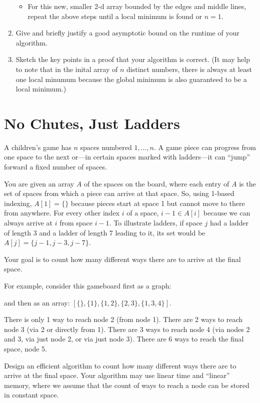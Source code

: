 \documentclass[11pt, oneside]{article}   	%
\theoremstyle{definition}
\theoremstyle{remark}
\begin{document}
\begin{enumerate}
\begin{itemize}
   \item For this new, smaller 2-d array bounded by the edges and middle lines, repeat the above steps until a local minimum is found or $n=1$.
   \end{itemize}
\item Give and briefly justify a good asymptotic bound on the runtime of
   your algorithm.
\item Sketch the key points in a proof that your algorithm is
   correct. (It may help to note that in the inital array of $n$
   distinct numbers, there is always at least one local minumum
   because the global minimum is also guaranteed to be a local
   minimum.)
\end{enumerate}

\section{No Chutes, Just Ladders}
\label{sec-4}

A children's game has $n$ spaces numbered $1, \ldots, n$. A game piece
can progress from one space to the next or---in certain spaces marked
with ladders---it can ``jump'' forward a fixed number of spaces.

You are given an array $A$ of the spaces on the board, where each
entry of $A$ is the set of spaces from which a piece can arrive at
that space. So, using 1-based indexing, $A[1] = \{\}$ because pieces
start at space 1 but cannot move to there from anywhere. For every
other index $i$ of a space, $i-1 \in A[i]$ because we can always
arrive at $i$ from space $i-1$. To illustrate ladders, if space $j$
had a ladder of length 3 and a ladder of length 7 leading to it, its
set would be $A[j] = \{j-1, j-3, j-7\}$.

Your goal is to count how many different ways there are to arrive at
the final space.

For example, consider this gameboard first as a graph:


and then as an array: $[\{\}, \{1\}, \{1,2\}, \{2,3\}, \{1,3,4\}]$.

There is only 1 way to reach node 2 (from node 1). There are 2 ways to
reach node 3 (via 2 or directly from 1). There are 3 ways to reach
node 4 (via nodes 2 and 3, via just node 2, or via just node 3). There
are 6 ways to reach the final space, node 5.

Design an efficient algorithm to count how many different ways there
are to arrive at the final space. Your algorithm may use linear time
and ``linear'' memory, where we assume that the count of ways to reach a
node can be stored in constant space.
\end{document}
